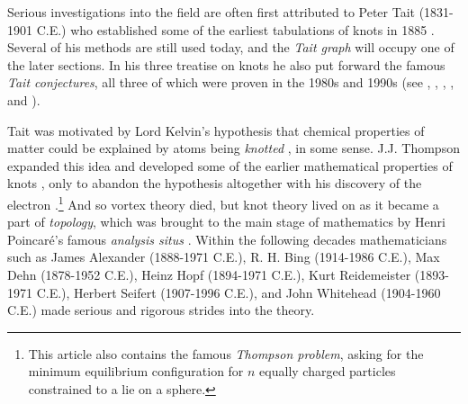 \par\hfill\par
Serious investigations into the field are often first attributed to Peter Tait
(1831-1901 C.E.) who established some of the earliest tabulations of knots
in 1885 \cite{TaitOnKnots1885}. Several of his methods are still used today,
and the \textit{Tait graph} will occupy one of the later sections.
In his three treatise on knots he also put forward the famous
\textit{Tait conjectures}, all three of which were proven in the 1980s and
1990s (see \cite{MurasugiJonesPolynomial}, \cite{KauffmanStateModels},
\cite{ThistlethwaiteSpanningTree}, \cite{ThistlethwaiteKauffmanPolynomial},
and \cite{ThistlethwiateMenascoAlternatingLinks}).

\par\hfill\par
Tait was motivated by Lord Kelvin's hypothesis that chemical properties
of matter could be explained by atoms being \textit{knotted}
\cite{ThompsonVortex1867}, in some sense. J.J. Thompson expanded this idea and
developed some of the earlier mathematical properties of knots
\cite{ThompsonVortexRings1883}, only to abandon the hypothesis altogether with
his discovery of the electron \cite{ThompsonStructureOfAtoms1904}.\footnote{%
    This article also contains the famous \textit{Thompson problem}, asking for
    the minimum equilibrium configuration for $n$ equally charged particles
    constrained to a lie on a sphere.
}
And so vortex theory died, but knot theory lived on as it became a part of
\textit{topology}, which was brought to the main stage of mathematics
by Henri Poincar\'{e}'s famous \textit{analysis situs}
\cite{PoincareAnalysisSitus1895}. Within the following decades mathematicians
such as James Alexander (1888-1971 C.E.), R. H. Bing (1914-1986 C.E.),
Max Dehn (1878-1952 C.E.), Heinz Hopf (1894-1971 C.E.),
Kurt Reidemeister (1893-1971 C.E.), Herbert Seifert (1907-1996 C.E.),
and John Whitehead (1904-1960 C.E.) made serious and rigorous strides
into the theory.
